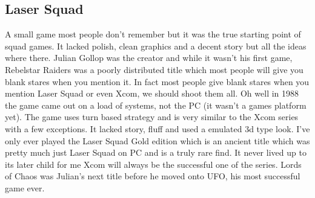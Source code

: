 \documentclass[a4paper]{article}
\begin{document}
\subsection{Laser Squad}
A small game most people don't remember but it was the true starting point of squad games. It lacked polish, clean graphics and a decent story but all the ideas where there. Julian Gollop was the creator and while it wasn't his first game, Rebelstar Raiders was a poorly distributed title which most people will give you blank stares when you mention it. In fact most people give blank stares when you mention Laser Squad or even Xcom, we should shoot them all. Oh well in 1988 the game came out on a load of systems, not the PC (it wasn't a games platform yet). The game uses turn based strategy and is very similar to the Xcom series with a few exceptions. It lacked story, fluff and used a emulated 3d type look. I've only ever played the Laser Squad Gold edition which is an ancient title which was pretty much just Laser Squad on PC and is a truly rare find. It never lived up to its later child for me Xcom will always be the successful one of the series. Lords of Chaos was Julian's next title before he moved onto UFO, his most successful game ever.
\end{document}
